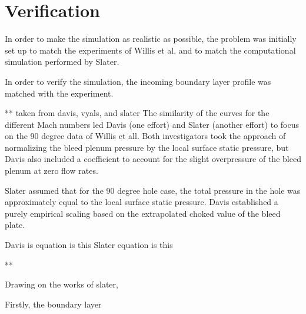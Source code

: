 \section{Verification}

In order to make the simulation as realistic as possible, the problem was initially set up to match the experiments of Willis et al. and to match the computational simulation performed by Slater. 

In order to verify the simulation, the incoming boundary layer profile was matched with the experiment.

** taken from davis, vyals, and slater
The similarity of the curves for the different Mach numbers led Davis (one effort) and Slater (another effort) to focus on the 90 degree data of Willis et all. Both investigators took the approach of normalizing the bleed plenum pressure by the local surface static pressure, but Davis also included a coefficient to account for the slight overpressure of the bleed plenum at zero flow rates. 

Slater assumed that for the 90 degree hole case, the total pressure in the hole was approximately equal to the local surface static pressure. Davis established a purely empirical scaling based on the extrapolated choked value of the bleed plate.

Davis is equation is this
Slater equation is this



**

Drawing on the works of slater, 

Firstly, the boundary layer